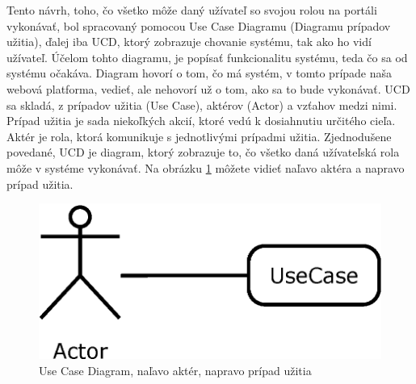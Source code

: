 Tento návrh, toho, čo všetko môže daný užívateľ so svojou rolou na portáli vykonávať, bol spracovaný pomocou Use Case Diagramu (Diagramu prípadov užitia), ďalej iba UCD, ktorý zobrazuje chovanie systému, tak ako ho vidí užívateľ. Účelom tohto diagramu, je popísať funkcionalitu systému, teda čo sa od systému očakáva. Diagram hovorí o tom, čo má systém, v tomto prípade naša webová platforma, vedieť, ale nehovorí už o tom, ako sa to bude vykonávať. UCD sa skladá, z prípadov užitia (Use Case), aktérov (Actor) a vzťahov medzi nimi. Prípad užitia je sada niekoľkých akcií, ktoré vedú k dosiahnutiu určitého cieľa. Aktér je rola, ktorá komunikuje s jednotlivými prípadmi užitia. Zjednodušene povedané, UCD je diagram, ktorý zobrazuje to, čo všetko daná užívateľská rola môže v systéme vykonávať. Na obrázku \ref{fig:ucd} môžete vidieť naľavo aktéra a napravo prípad užitia.
\begin{figure}[h]
  \centering
  \includegraphics[scale=0.43]{fig/ucd.eps}
  \caption{Use Case Diagram, naľavo aktér, napravo prípad užitia}
  \label{fig:ucd}
\end{figure}

